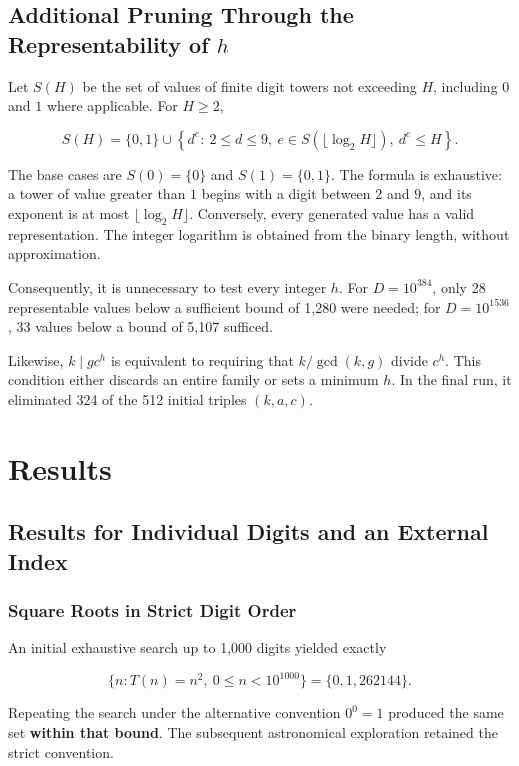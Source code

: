\documentclass[11pt,a4paper]{article}
\begin{document}
\subsection{Additional Pruning Through the Representability of $h$}

Let $S(H)$ be the set of values of finite digit towers not exceeding $H$, including $0$ and $1$ where applicable. For $H\geq2$,

\[
S(H)=\{0,1\}\cup
\left\{d^e:\ 2\leq d\leq9,\ e\in S(\lfloor\log_2H\rfloor),\ d^e\leq H\right\}.
\]

The base cases are $S(0)=\{0\}$ and $S(1)=\{0,1\}$. The formula is exhaustive: a tower of value greater than $1$ begins with a digit between $2$ and $9$, and its exponent is at most $\lfloor\log_2H\rfloor$. Conversely, every generated value has a valid representation. The integer logarithm is obtained from the binary length, without approximation.

Consequently, it is unnecessary to test every integer $h$. For $D=10^{384}$, only 28 representable values below a sufficient bound of 1,280 were needed; for $D=10^{1536}$, 33 values below a bound of 5,107 sufficed.

Likewise, $k\mid gc^h$ is equivalent to requiring that $k/\gcd(k,g)$ divide $c^h$. This condition either discards an entire family or sets a minimum $h$. In the final run, it eliminated 324 of the 512 initial triples $(k,a,c)$.

\section{Results}

\subsection{Results for Individual Digits and an External Index}

\subsubsection{Square Roots in Strict Digit Order}

An initial exhaustive search up to 1,000 digits yielded exactly

\[
\{n:T(n)=n^2,\ 0\leq n<10^{1000}\}=\{0,1,262144\}.
\]

Repeating the search under the alternative convention $0^0=1$ produced the same set \textbf{within that bound}. The subsequent astronomical exploration retained the strict convention.
\end{document}
